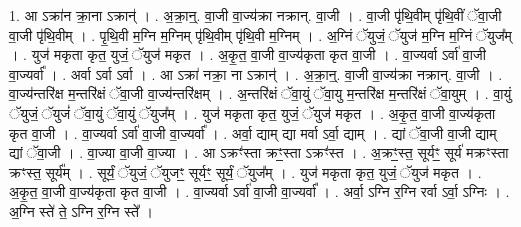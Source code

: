 \documentclass[17pt]{extarticle}
\begin{document}
1. आ ऽक्रा॑न क्रा॒ना ऽक्रान्॑ । . अ॒क्रा॒न्॒. वा॒जी वा॒ज्य॑क्रा नक्रान्. वा॒जी । . वा॒जी पृ॑थि॒वीम् पृ॑थि॒वीं ॅवा॒जी वा॒जी पृ॑थि॒वीम् । . पृ॒थि॒वी म॒ग्नि म॒ग्निम् पृ॑थि॒वीम् पृ॑थि॒वी म॒ग्निम् । . अ॒ग्निं ॅयुजं॒ ॅयुज॑ म॒ग्नि म॒ग्निं ॅयुज᳚म् । . युज॑ मकृता कृत॒ युजं॒ ॅयुज॑ मकृत । . अ॒कृ॒त॒ वा॒जी वा॒ज्य॑कृता कृत वा॒जी । . वा॒ज्यर्वा ऽर्वा॑ वा॒जी वा॒ज्यर्वा᳚ । . अर्वा ऽर्वा ऽर्वा । . आ ऽक्रा॑ नक्रा॒ ना ऽक्रान्॑ । . अ॒क्रा॒न्॒. वा॒जी वा॒ज्य॑क्रा नक्रान्. वा॒जी । . वा॒ज्य॑न्तरि॑क्ष म॒न्तरि॑क्षं ॅवा॒जी वा॒ज्य॑न्तरि॑क्षम् । . अ॒न्तरि॑क्षं ॅवा॒युं ॅवा॒यु म॒न्तरि॑क्ष म॒न्तरि॑क्षं ॅवा॒युम् । . वा॒युं ॅयुजं॒ ॅयुजं॑ ॅवा॒युं ॅवा॒युं ॅयुज᳚म् । . युज॑ मकृता कृत॒ युजं॒ ॅयुज॑ मकृत । . अ॒कृ॒त॒ वा॒जी वा॒ज्य॑कृता कृत वा॒जी । . वा॒ज्यर्वा ऽर्वा॑ वा॒जी वा॒ज्यर्वा᳚ । . अर्वा॒ द्याम् द्या मर्वा ऽर्वा॒ द्याम् । . द्यां ॅवा॒जी वा॒जी द्याम् द्यां ॅवा॒जी । . वा॒ज्या वा॒जी वा॒ज्या । . आ ऽक्रꣳ॑स्ता क्रꣳ॒॒स्ता ऽक्रꣳ॑स्त । . अ॒क्रꣳ॒॒स्त॒ सूर्यꣳ॒॒ सूर्य॑ मक्रꣳस्ता क्रꣳस्त॒ सूर्य᳚म् । . सूर्यं॒ ॅयुजं॒ ॅयुजꣳ॒॒ सूर्यꣳ॒॒ सूर्यं॒ ॅयुज᳚म् । . युज॑ मकृता कृत॒ युजं॒ ॅयुज॑ मकृत । . अ॒कृ॒त॒ वा॒जी वा॒ज्य॑कृता कृत वा॒जी । . वा॒ज्यर्वा ऽर्वा॑ वा॒जी वा॒ज्यर्वा᳚ । . अर्वा॒ ऽग्नि र॒ग्नि रर्वा ऽर्वा॒ ऽग्निः । . अ॒ग्नि स्ते॑ ते॒ ऽग्नि र॒ग्नि स्ते᳚ । \newline
\end{document}
